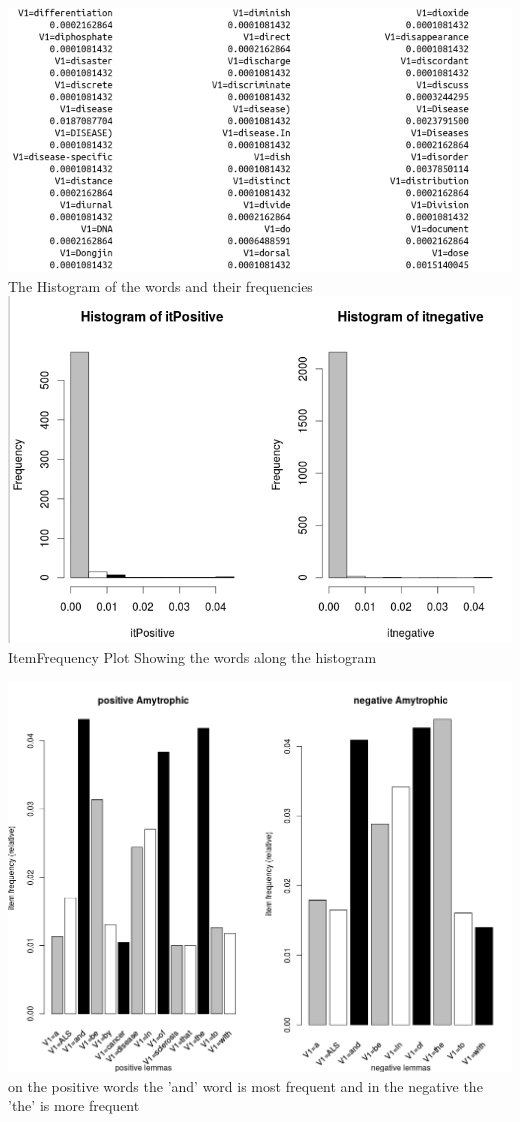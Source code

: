 \documentclass{article}
\begin{document}
\includegraphics[width=0.8\linewidth]{freqneg.png}\\
The Histogram of the words and their frequencies\\
	\includegraphics[width=0.8\linewidth]{Amytrophic1.png}\\
	
	ItemFrequency Plot Showing the words along the histogram
	
	\includegraphics[width=0.8\linewidth]{Amytrophic2.png}\\
	on the positive words the 'and' word is most frequent and in the negative the 'the' is more frequent
	
\end{document}
